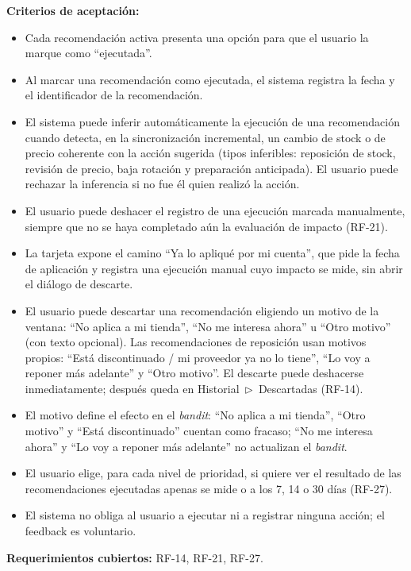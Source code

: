 \noindent\textbf{Criterios de aceptación:}
\begin{itemize}
    \item Cada recomendación activa presenta una opción para que el usuario la marque como \enquote{ejecutada}.
    \item Al marcar una recomendación como ejecutada, el sistema registra la fecha y el identificador de la recomendación.
    \item El sistema puede inferir automáticamente la ejecución de una recomendación cuando detecta, en la sincronización incremental, un cambio de stock o de precio coherente con la acción sugerida (tipos inferibles: reposición de stock, revisión de precio, baja rotación y preparación anticipada). El usuario puede rechazar la inferencia si no fue él quien realizó la acción.
    \item El usuario puede deshacer el registro de una ejecución marcada manualmente, siempre que no se haya completado aún la evaluación de impacto (RF-21).
    \item La tarjeta expone el camino \enquote{Ya lo apliqué por mi cuenta}, que pide la fecha de aplicación y registra una ejecución manual cuyo impacto se mide, sin abrir el diálogo de descarte.
    \item El usuario puede descartar una recomendación eligiendo un motivo de la ventana: \enquote{No aplica a mi tienda}, \enquote{No me interesa ahora} u \enquote{Otro motivo} (con texto opcional). Las recomendaciones de reposición usan motivos propios: \enquote{Está discontinuado / mi proveedor ya no lo tiene}, \enquote{Lo voy a reponer más adelante} y \enquote{Otro motivo}. El descarte puede deshacerse inmediatamente; después queda en Historial~$\triangleright$~Descartadas (RF-14).
    \item El motivo define el efecto en el \emph{bandit}: \enquote{No aplica a mi tienda}, \enquote{Otro motivo} y \enquote{Está discontinuado} cuentan como fracaso; \enquote{No me interesa ahora} y \enquote{Lo voy a reponer más adelante} no actualizan el \emph{bandit}.
    \item El usuario elige, para cada nivel de prioridad, si quiere ver el resultado de las recomendaciones ejecutadas apenas se mide o a los 7, 14 o 30 días (RF-27).
    \item El sistema no obliga al usuario a ejecutar ni a registrar ninguna acción; el feedback es voluntario.
\end{itemize}

\noindent\textbf{Requerimientos cubiertos:} RF-14, RF-21, RF-27.

